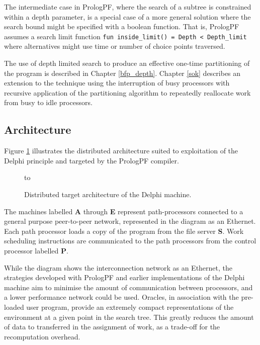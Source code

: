The intermediate case in PrologPF, where the search of a subtree is constrained within
a depth parameter, is a special case of a more general solution where the search bound
might be specified with a boolean function.  That is, PrologPF assumes a search limit
function \texttt{fun inside\_{}limit() = Depth < Depth\_{}limit} where alternatives might
use time or number of choice points traversed.

The use of depth limited search to produce an effective one-time partitioning of the
program is described in Chapter \ref{bfp_depth}. Chapter \ref{sok} describes an
extension to the technique using the interruption of busy processors with recursive
application of the partitioning algorithm to repeatedly reallocate work from busy to
idle processors.

\subsection{Architecture}

Figure \ref{architecture} illustrates the distributed architecture suited
to exploitation of the Delphi principle and targeted by the
PrologPF compiler.

\begin{figure}[h]
\vspace{5mm} \hbox to 
\caption{Distributed target architecture of the Delphi machine.}
\vspace{5mm}
\label{architecture}
\end{figure}

The machines labelled \textbf{A} through \textbf{E} represent path-processors connected to
a general purpose peer-to-peer network, represented in the diagram as an Ethernet.  Each
path processor loads a copy of the program from the file server \textbf{S}.  Work 
scheduling
instructions are communicated to the path processors from the control processor labelled
\textbf{P}.

While the diagram shows the interconnection network as an Ethernet, the strategies developed
with PrologPF and earlier implementations of the Delphi machine aim to minimise the
amount of communication between processors, and a lower performance network could be used.
Oracles, in association with the pre-loaded user program,
provide an extremely compact representations of the environment at a given point in the search
tree.  This greatly reduces the amount of data to transferred in the assignment of work,
as a trade-off for the recomputation overhead.

